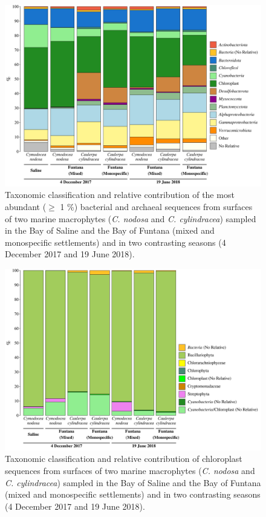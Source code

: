 \documentclass[12pt,]{article}
\begin{document}
\newpage
\begin{figure}[ht]

{\centering \includegraphics[width=1\linewidth]{../results/figures/community_bar_plot} 

}

\caption{Taxonomic classification and relative contribution of the most abundant ($\geq$ 1 \si{\percent}) bacterial and archaeal sequences from surfaces of two marine macrophytes (\textit{C. nodosa} and \textit{C. cylindracea}) sampled in the Bay of Saline and the Bay of Funtana (mixed and monospecific settlements) and in two contrasting seasons (4 December 2017 and 19 June 2018).\label{community}}\label{fig:unnamed-chunk-3}
\end{figure}

\newpage
\begin{figure}[ht]

{\centering \includegraphics[width=1\linewidth]{../results/figures/chloroplast} 

}

\caption{Taxonomic classification and relative contribution of chloroplast sequences from surfaces of two marine macrophytes (\textit{C. nodosa} and \textit{C. cylindracea}) sampled in the Bay of Saline and the Bay of Funtana (mixed and monospecific settlements) and in two contrasting seasons (4 December 2017 and 19 June 2018).\label{chloroplast}}\label{fig:unnamed-chunk-4}
\end{figure}
\end{document}

